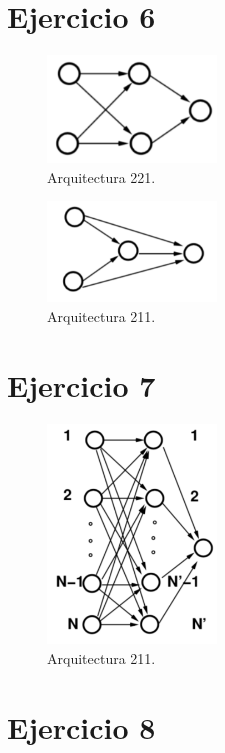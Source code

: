 \section*{Ejercicio 6}

\begin{figure}[H]
    \centering
    \includegraphics[width=0.4\textwidth]{Graphs/221.png}
    \caption{Arquitectura 221.}
    \label{fig:221}
\end{figure}


\begin{figure}[H]
    \centering
    \includegraphics[width=0.4\textwidth]{Graphs/211.png}
    \caption{Arquitectura 211.}
    \label{fig:221}
\end{figure}


\section*{Ejercicio 7}

\begin{figure}[H]
    \centering
    \includegraphics[width=0.4\textwidth]{Graphs/NN1.png}
    \caption{Arquitectura 211.}
    \label{fig:NN1}
\end{figure}

\section*{Ejercicio 8}


